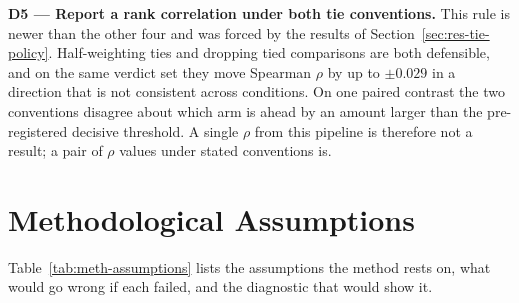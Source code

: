 \textbf{D5 --- Report a rank correlation under both tie conventions.}
This rule is newer than the other four and was forced by the results of
Section~\ref{sec:res-tie-policy}. Half-weighting ties and dropping tied
comparisons are both defensible, and on the same verdict set they move
Spearman $\rho$ by up to $\pm0.029$ in a direction that is not
consistent across conditions. On one paired contrast the two
conventions disagree about which arm is ahead by an amount larger than
the pre-registered decisive threshold. A single $\rho$ from this
pipeline is therefore not a result; a pair of $\rho$ values under
stated conventions is.

\section{Methodological Assumptions}\label{sec:meth-assumptions}

Table~\ref{tab:meth-assumptions} lists the assumptions the method rests
on, what would go wrong if each failed, and the diagnostic that would
show it.

